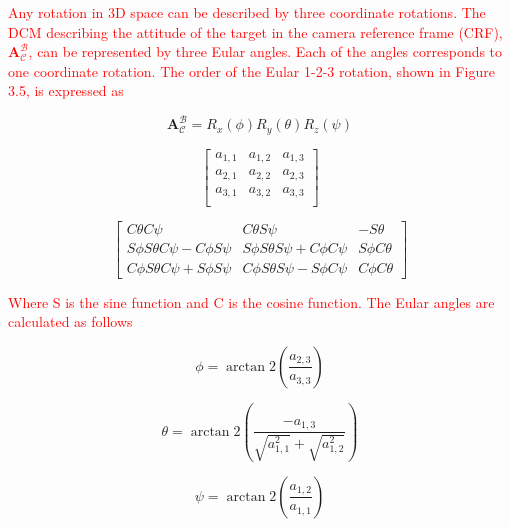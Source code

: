 \textcolor{red}{Any rotation in 3D space can be described by three coordinate rotations. The DCM describing the attitude of the target in the camera reference frame
(CRF), $\mathbf{A}_{\mathcal{C}}^{\mathcal{B}}$, can be represented by three Eular angles. Each of the angles corresponds to one coordinate rotation. The order
of the Eular 1-2-3 rotation, shown in Figure 3.5, is expressed as}

\begin{equation}
    \boldsymbol{A}_{\mathcal{C}}^{\mathcal{B}} = R_x(\phi)R_y(\theta)R_z(\psi)
    \label{Eq:3.4}
\end{equation}

\begin{equation}
    \begin{bmatrix}
        a_{1,1} & a_{1,2} & a_{1,3}\\
        a_{2,1} & a_{2,2} & a_{2,3}\\
        a_{3,1} & a_{3,2} & a_{3,3}\\
    \end{bmatrix}
\end{equation}

\begin{equation}
    \begin{bmatrix}
        C\theta C\psi & C\theta S\psi &  -S\theta\\
        S\phi S\theta C\psi - C\phi S\psi & S\phi S\theta S\psi + C\phi C\psi & S\phi C\theta\\
        C\phi S\theta C\psi + S\phi S\psi &  C\phi S\theta S\psi - S\phi C\psi & C\phi C\theta
    \end{bmatrix}
\end{equation}

\textcolor{red}{Where S is the sine function and C is the cosine function. The Eular angles are calculated as follows}

\begin{equation}
    \phi = \arctan2\left(\frac{a_{2,3}}{a_{3,3}}\right)
\end{equation}

\begin{equation}
    \theta = \arctan2\left(\frac{-a_{1,3}}{\sqrt{a_{1,1}^2} + \sqrt{a_{1,2}^2}}\right)
\end{equation}

\begin{equation}
    \psi = \arctan2\left(\frac{a_{1,2}}{a_{1,1}}\right)
\end{equation}


